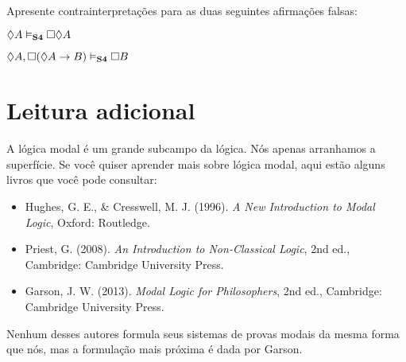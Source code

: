 \problempart
Apresente contrainterpretações para as duas seguintes afirmações falsas:
\begin{earg}
	\item $\Diamond A\vDash_{\mathbf{S4}} \Box\Diamond A$
	\item $\Diamond A, \Box (\Diamond A \rightarrow B)\vDash_{\mathbf{S4}}\Box B$
\end{earg}

\section*{Leitura adicional}

A lógica modal é um grande subcampo da lógica. Nós apenas arranhamos a superfície. Se você quiser aprender mais sobre lógica modal, aqui estão alguns livros que você pode consultar:

\begin{itemize}
	\item Hughes, G. E., \& Cresswell, M. J. (1996). \emph{A New Introduction to Modal Logic}, Oxford: Routledge.
	\item Priest, G. (2008). \emph{An Introduction to Non-Classical Logic}, 2nd ed., Cambridge: Cambridge University Press.
	\item Garson, J. W. (2013). \emph{Modal Logic for Philosophers}, 2nd ed., Cambridge: Cambridge University Press.
\end{itemize}

Nenhum desses autores formula seus sistemas de provas modais da mesma forma que nós, mas a formulação mais próxima é dada por Garson. 






